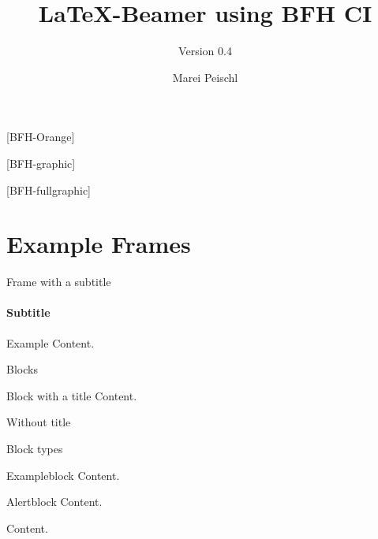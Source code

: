 \documentclass[
    ngerman,%
    authorontitle=true,
]{bfhbeamer}
\title{\LaTeX-Beamer using BFH CI}
\subtitle{Version 0.4}
\author[M. Peischl]{Marei Peischl}
\institute{pei\TeX}
\begin{document}
    \maketitle

    [BFH-Orange]
    \maketitle

    [BFH-graphic]
    \maketitle

    [BFH-fullgraphic]
    \maketitle

    \section{Example Frames}

    \begin{frame}{Frame with a subtitle}
        \framesubtitle{Subtitle}
        Example Content.
    \end{frame}

    \begin{frame}{Blocks}
        \begin{block}{Block with a title}
            Content.
        \end{block}
        \begin{block}{}
            Without title
        \end{block}
    \end{frame}

    \begin{frame}{Block types}
        \begin{exampleblock}{Exampleblock}
            Content.
        \end{exampleblock}
        \begin{alertblock}{Alertblock}
            Content.
        \end{alertblock}
        \begin{example}
            Content.
        \end{example}
    \end{frame}
\end{document}
